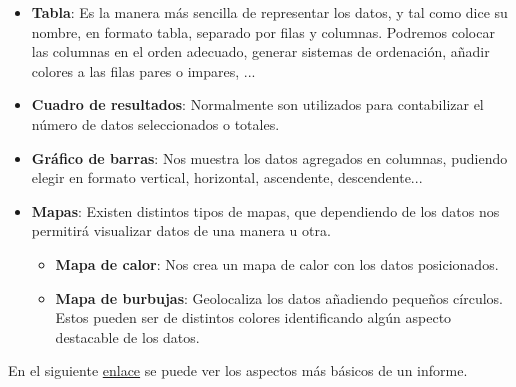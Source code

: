 \begin{itemize}
    \item \textbf{Tabla}: Es la manera más sencilla de representar los datos, y tal como dice su nombre, en formato tabla, separado por filas y columnas. Podremos colocar las columnas en el orden adecuado, generar sistemas de ordenación, añadir colores a las filas pares o impares, ...

    \item \textbf{Cuadro de resultados}: Normalmente son utilizados para contabilizar el número de datos seleccionados o totales.

    \item \textbf{Gráfico de barras}: Nos muestra los datos agregados en columnas, pudiendo elegir en formato vertical, horizontal, ascendente, descendente...

    \item \textbf{Mapas}: Existen distintos tipos de mapas, que dependiendo de los datos nos permitirá visualizar datos de una manera u otra.
    \begin{itemize}
        \item \textbf{Mapa de calor}: Nos crea un mapa de calor con los datos posicionados.
        \item \textbf{Mapa de burbujas}: Geolocaliza los datos añadiendo pequeños círculos. Estos pueden ser de distintos colores identificando algún aspecto destacable de los datos.
    \end{itemize}
\end{itemize}

En el siguiente \href{https://lookerstudio.google.com/reporting/a08f1776-4f54-4421-9a3e-69f2f4130b80/page/GaKdD}{enlace} se puede ver los aspectos más básicos de un informe.